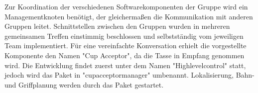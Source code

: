 Zur Koordination der verschiedenen Softwarekomponenten der Gruppe wird ein Managementknoten benötigt, der gleichermaßen die Kommunikation mit anderen Gruppen leitet. Schnittstellen zwischen den Gruppen wurden in mehreren gemeinsamen Treffen einstimmig beschlossen und selbstständig vom jeweiligen Team implementiert. Für eine vereinfachte Konversation erhielt die vorgestellte Komponente den Namen "Cup Acceptor", da die Tasse in Empfang genommen wird. Die Entwicklung findet zuerst unter dem Namen "Highlevelcontrol" statt, jedoch wird das Paket in "cup\textunderscore acceptor\textunderscore manager" umbenannt. Lokalisierung, Bahn- und Griffplanung werden durch das Paket gestartet.
